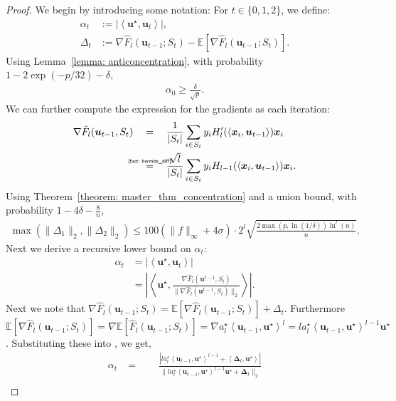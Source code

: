 \documentclass[final,12pt]{colt2018} %
\newcommand{\E}{\mathbb{E}}
\newcommand{\explain}[2]{\mathrel{\overset{\makebox[0pt]{\mbox{\normalfont\tiny\sffamily #1}}}{#2}}}
\renewcommand\v[1]{{\ensuremath{\boldsymbol{#1}}}}
\newcommand\ip[1]{\left\langle #1 \right\rangle}
\begin{document}
\begin{proof}
We begin by introducing some notation:
For $t\in \{0,1,2\}$, we define: 
\begin{align*}
    \alpha_t & := |\ip{\v u^\star, \v u_t}|, \\
    \Delta_t & := \nabla \hat{F}_l(\v u_{t-1}; S_t) - \E[\nabla \hat{F}_l(\v u_{t-1}; S_t)].
\end{align*}
Using Lemma~\ref{lemma: anticoncentration}, with probability $1-2\exp(-p/32) - \delta$,
\begin{align*}
    \alpha_0 \geq \frac{\delta}{\sqrt{p}}.
\end{align*}
We can further compute the expression for the gradients as each iteration: 
\begin{align*}
    \nabla \hat{F}_l(\v u_{t-1}, S_t) & \quad= \quad \frac{1}{|S_t|} \sum_{i \in S_t} y_i H_l^\prime(\ip{\v x_i, \v u_{t-1}}) \v x_i \\
    &\quad \explain{\Cref{fact: hermite_diff}}{=}\quad \frac{\sqrt{l}}{|S_t|} \sum_{i \in S_t} y_i H_{l-1}(\ip{\v x_i, \v u_{t-1}})\v x_i.
\end{align*}
Using Theorem~\ref{theorem: master_thm_concentration} and a union bound, with probability $1-4\delta - \frac{8}{n}$,
\begin{align*}
    \max(\|\Delta_1\|_2,\|\Delta_2\|_2) \leq 100 (\|f\|_\infty + 4\sigma) \cdot 2^l \sqrt{\frac{2\max(p,\ln(1/\delta))\ln^l(n)}{n}}.
\end{align*}
Next we derive a recursive lower bound on $\alpha_t$:
\begin{align}
    \alpha_t & = | \ip{\v u^\star, \v u_t} | \nonumber \\
    & = \left| \ip{\v u^\star, \frac{\nabla\hat{F}_l(\v u^{t-1},S_t)}{\|\nabla\hat{F}_l(\v u^{t-1},S_t)\|_2} } \right| \label{equation: algo_1_analysis_eq1}.
\end{align}
Next we note that $\nabla \hat{F}_l(\v u_{t-1}; S_t) = \E[\nabla \hat{F}_l(\v u_{t-1}; S_t)] + \Delta_t$. Furthermore $\E[\nabla \hat{F}_l(\v u_{t-1}; S_t)] = \nabla \E[\hat{F}_l(\v u_{t-1}; S_t)] =  \nabla a_l^\star \ip{\v u_{t-1}, \v u^\star}^l = l a_l^\star \ip{\v u_{t-1}, \v u^\star}^{l-1} \v u^\star$. Substituting these into , we get,
\begin{align}
    \alpha_t &= \qquad \frac{|l a_l^\star \ip{\v u_{t-1}, \v u^\star}^{l-1} + \ip{\v \Delta_t, \v u^\star}|}{\|l a_l^\star \ip{\v u_{t-1}, \v u^\star}^{l-1} \v u^\star + \v \Delta_t \|_2} \nonumber \\

\end{align}
\end{proof}
\end{document}
